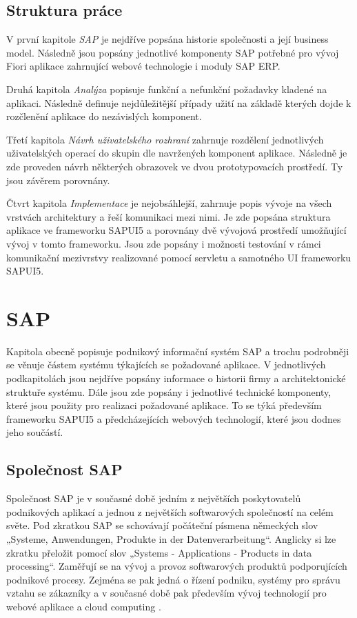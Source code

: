 \documentclass[thesis=M,czech]{FITthesis}[2012/06/26]
\begin{document}
\begin{introduction}
\section{Struktura práce}
V první kapitole \textit{SAP} je nejdříve popsána historie společnosti a její business model. Následně jsou popsány jednotlivé komponenty SAP potřebné pro vývoj Fiori aplikace zahrnující webové technologie i moduly SAP ERP. 

Druhá kapitola \textit{Analýza} popisuje funkční a nefunkční požadavky kladené na aplikaci. Následně definuje nejdůležitější případy užití na základě kterých dojde k rozčlenění aplikace do nezávislých komponent. 

Třetí kapitola \textit{Návrh uživatelského rozhraní} zahrnuje rozdělení jednotlivých uživatelských operací do skupin dle navržených komponent aplikace. Následně je zde proveden návrh některých obrazovek ve dvou prototypovacích prostředí. Ty jsou závěrem porovnány.

Čtvrt kapitola \textit{Implementace} je nejobsáhlejší, zahrnuje popis vývoje na všech vrstvách architektury a řeší komunikaci mezi nimi. Je zde popsána struktura aplikace ve frameworku SAPUI5 a porovnány dvě vývojová prostředí umožňující vývoj v tomto frameworku. Jsou zde popsány i možnosti testování v rámci komunikační mezivrstvy realizované pomocí servletu a samotného UI frameworku SAPUI5.
\end{introduction}

\chapter{SAP}
Kapitola obecně popisuje podnikový informační systém SAP a trochu podrobněji se věnuje částem systému týkajících se požadované aplikace. V jednotlivých podkapitolách jsou nejdříve popsány informace o historii firmy a architektonické struktuře systému. Dále jsou zde popsány i jednotlivé technické komponenty, které jsou použity pro realizaci požadované aplikace. To se týká především frameworku SAPUI5 a předcházejících webových technologií, které jsou dodnes jeho součástí.

\section{Společnost SAP}
Společnost SAP je v současné době jedním z největších poskytovatelů podnikových aplikací a jednou z největších softwarových společností na celém světe. Pod zkratkou SAP se schovávají počáteční písmena německých slov „Systeme, Anwendungen, Produkte in der Datenverarbeitung“. Anglicky si lze zkratku přeložit pomocí slov „Systems - Applications - Products in data processing“. Zaměřují se na vývoj a provoz softwarových produktů podporujících podnikové procesy. Zejména se pak jedná o řízení podniku, systémy pro správu vztahu se zákazníky a v současné době pak především vývoj technologií pro webové aplikace a cloud computing \cite{sap_information}.
\end{document}

